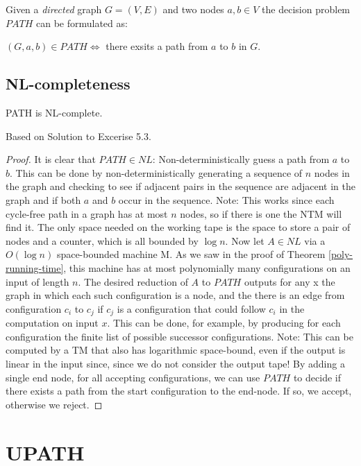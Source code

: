 Given a \emph{directed} graph $G = (V, E)$ and two nodes $a, b \in V$
the decision problem $PATH$ can be formulated as:

$(G, a, b) \in PATH \Leftrightarrow $ there exsits a path from $a$ to
$b$ in $G$.

\subsection{NL-completeness}\label{nl-completeness}

\begin{thm}
\label{path-nl-complete}
PATH is NL-complete.
\end{thm}

Based on  Solution to Excerise
5.3.

\begin{proof}
It is clear that $PATH \in NL$: Non-deterministically guess a path from
$a$ to $b$. This can be done by non-deterministically generating a sequence of $n$
nodes in the graph and checking to see if adjacent pairs in the sequence are
adjacent in the graph and if both $a$ and $b$ occur in the sequence.
Note: This works since each cycle-free path in a graph has at most $n$ nodes, so if there is one the NTM will find it.
The only space needed on the working tape is the space to store a pair of nodes and a counter, which is all bounded by $\log n$.
Now let $A \in NL$ via a $O(\log n)$ space-bounded machine M. As we saw in the proof of Theorem \ref{poly-running-time},
this machine has at most polynomially many configurations on an input of length $n$.
The desired reduction of $A$ to $PATH$ outputs for any x the
graph in which each such configuration is a node, and the there is an edge
from configuration $c_i$ to $c_j$ if $c_j$ is a configuration that could follow $c_i$ in the computation on
input $x$. This can be done, for example, by producing for each configuration the finite list of possible successor configurations.
Note: This can be computed by a TM that also has logarithmic space-bound, even if the output is linear in the input since,
since we do not consider the output tape!
By adding a single end node, for all accepting configurations, we can use $PATH$ to decide if there exists a path
from the start configuration to the end-node. If so, we accept, otherwise we reject.
\end{proof}

\section{UPATH}\label{upath}

